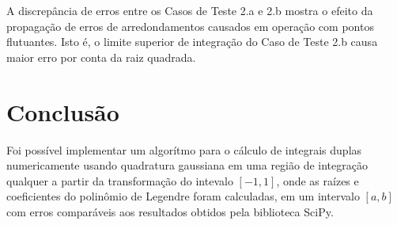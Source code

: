\documentclass[a4,12pt]{horizon-theme}
\begin{document}
A discrepância de erros entre os Casos de Teste 2.a e 2.b mostra o efeito da propagação de erros de arredondamentos causados em operação com pontos flutuantes. Isto é, o limite superior de integração do Caso de Teste 2.b causa maior erro por conta da raiz quadrada.


\section{Conclusão}
Foi possível implementar um algorítmo para o cálculo de integrais duplas numericamente usando quadratura gaussiana em uma região de integração qualquer a partir da transformação do intevalo $[-1, 1]$, onde as raízes e coeficientes do polinômio de Legendre foram calculadas, em um intervalo $[a, b]$ com erros comparáveis aos resultados obtidos pela biblioteca SciPy.








\horizonBackCover
\end{document}

